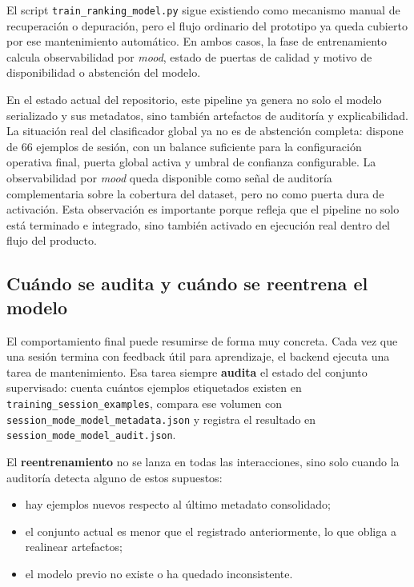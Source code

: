 El script \texttt{train\_ranking\_model.py} sigue existiendo como mecanismo
manual de recuperación o depuración, pero el flujo ordinario del prototipo ya
queda cubierto por ese mantenimiento automático. En ambos casos, la fase de
entrenamiento calcula observabilidad por \textit{mood}, estado de puertas de calidad y
motivo de disponibilidad o abstención del modelo.

En el estado actual del repositorio, este pipeline ya genera no solo el modelo
serializado y sus metadatos, sino también artefactos de auditoría y
explicabilidad. La situación real del clasificador global ya no es de
abstención completa: dispone de 66 ejemplos de sesión, con un balance
suficiente para la configuración operativa final, puerta global activa
y umbral de confianza configurable. La observabilidad por \textit{mood}
queda disponible como señal de auditoría complementaria sobre la cobertura del
dataset, pero no como puerta dura de activación. Esta
observación es importante porque refleja que el pipeline no solo está terminado
e integrado, sino también activado en ejecución real dentro del flujo del
producto.

\subsection{Cuándo se audita y cuándo se reentrena el modelo}

El comportamiento final puede resumirse de forma muy concreta. Cada vez que una
sesión termina con feedback útil para aprendizaje, el backend ejecuta una tarea
de mantenimiento. Esa tarea siempre \textbf{audita} el estado del conjunto
supervisado: cuenta cuántos ejemplos etiquetados existen en
\texttt{training\_session\_examples}, compara ese volumen con
\texttt{session\_mode\_model\_metadata.json} y registra el resultado en
\texttt{session\_mode\_model\_audit.json}.

El \textbf{reentrenamiento} no se lanza en todas las interacciones, sino solo
cuando la auditoría detecta alguno de estos supuestos:

\begin{itemize}
\item hay ejemplos nuevos respecto al último metadato consolidado;
\item el conjunto actual es menor que el registrado anteriormente, lo que obliga a realinear artefactos;
\item el modelo previo no existe o ha quedado inconsistente.
\end{itemize}

